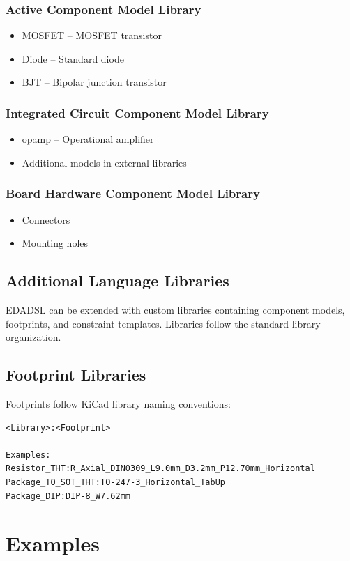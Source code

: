 \subsection{Active Component Model Library}
\begin{itemize}
\item MOSFET -- MOSFET transistor
\item Diode -- Standard diode
\item BJT -- Bipolar junction transistor
\end{itemize}

\subsection{Integrated Circuit Component Model Library}
\begin{itemize}
\item opamp -- Operational amplifier
\item Additional models in external libraries
\end{itemize}

\subsection{Board Hardware Component Model Library}
\begin{itemize}
\item Connectors
\item Mounting holes
\end{itemize}

\section{Additional Language Libraries}
EDADSL can be extended with custom libraries containing component models, footprints, and constraint templates. Libraries follow the standard library organization.

\section{Footprint Libraries}
Footprints follow KiCad library naming conventions:
\begin{verbatim}
<Library>:<Footprint>

Examples:
Resistor_THT:R_Axial_DIN0309_L9.0mm_D3.2mm_P12.70mm_Horizontal
Package_TO_SOT_THT:TO-247-3_Horizontal_TabUp
Package_DIP:DIP-8_W7.62mm
\end{verbatim}


\chapter{Examples}
